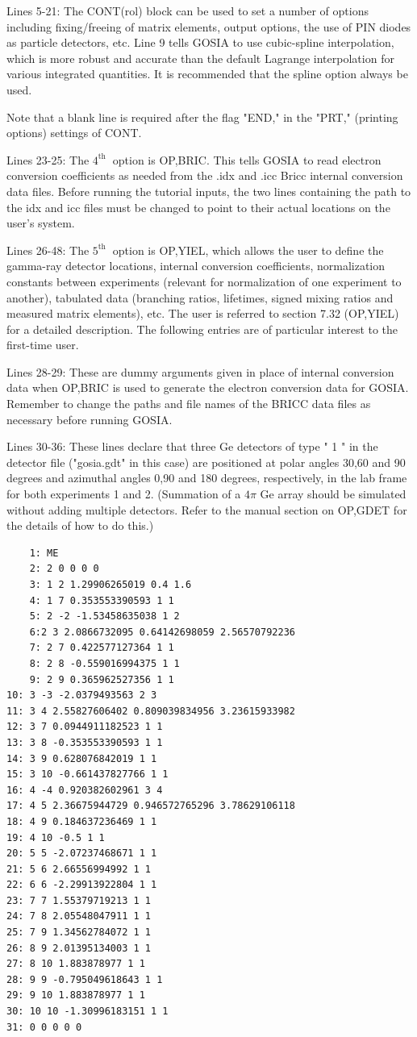 \documentclass[10pt]{article}
\begin{document}
Lines 5-21: The CONT(rol) block can be used to set a number of options including fixing/freeing of matrix elements, output options, the use of PIN diodes as particle detectors, etc. Line 9 tells GOSIA to use cubic-spline interpolation, which is more robust and accurate than the default Lagrange interpolation for various integrated quantities. It is recommended that the spline option always be used.

Note that a blank line is required after the flag "END," in the "PRT," (printing options) settings of CONT.

Lines 23-25: The $4^{\text {th }}$ option is OP,BRIC. This tells GOSIA to read electron conversion coefficients as needed from the .idx and .icc Bricc internal conversion data files. Before running the tutorial inputs, the two lines containing the path to the idx and icc files must be changed to point to their actual locations on the user's system.

Lines 26-48: The $5^{\text {th }}$ option is OP,YIEL, which allows the user to define the gamma-ray detector locations, internal conversion coefficients, normalization constants between experiments (relevant for normalization of one experiment to another), tabulated data (branching ratios, lifetimes, signed mixing ratios and measured matrix elements), etc. The user is referred to section 7.32 (OP,YIEL) for a detailed description. The following entries are of particular interest to the first-time user.

Lines 28-29: These are dummy arguments given in place of internal conversion data when OP,BRIC is used to generate the electron conversion data for GOSIA. Remember to change the paths and file names of the BRICC data files as necessary before running GOSIA.

Lines 30-36: These lines declare that three Ge detectors of type " 1 " in the detector file ("gosia.gdt" in this case) are positioned at polar angles 30,60 and 90 degrees and azimuthal angles 0,90 and 180 degrees, respectively, in the lab frame for both experiments 1 and 2. (Summation of a $4 \pi$ Ge array should be simulated without adding multiple detectors. Refer to the manual section on OP,GDET for the details of how to do this.)

\begin{verbatim}
    1: ME
    2: 2 0 0 0 0
    3: 1 2 1.29906265019 0.4 1.6
    4: 1 7 0.353553390593 1 1
    5: 2 -2 -1.53458635038 1 2
    6:2 3 2.0866732095 0.64142698059 2.56570792236
    7: 2 7 0.422577127364 1 1
    8: 2 8 -0.559016994375 1 1
    9: 2 9 0.365962527356 1 1
10: 3 -3 -2.0379493563 2 3
11: 3 4 2.55827606402 0.809039834956 3.23615933982
12: 3 7 0.0944911182523 1 1
13: 3 8 -0.353553390593 1 1
14: 3 9 0.628076842019 1 1
15: 3 10 -0.661437827766 1 1
16: 4 -4 0.920382602961 3 4
17: 4 5 2.36675944729 0.946572765296 3.78629106118
18: 4 9 0.184637236469 1 1
19: 4 10 -0.5 1 1
20: 5 5 -2.07237468671 1 1
21: 5 6 2.66556994992 1 1
22: 6 6 -2.29913922804 1 1
23: 7 7 1.55379719213 1 1
24: 7 8 2.05548047911 1 1
25: 7 9 1.34562784072 1 1
26: 8 9 2.01395134003 1 1
27: 8 10 1.883878977 1 1
28: 9 9 -0.795049618643 1 1
29: 9 10 1.883878977 1 1
30: 10 10 -1.30996183151 1 1
31: 0 0 0 0 0
\end{verbatim}
\end{document}
